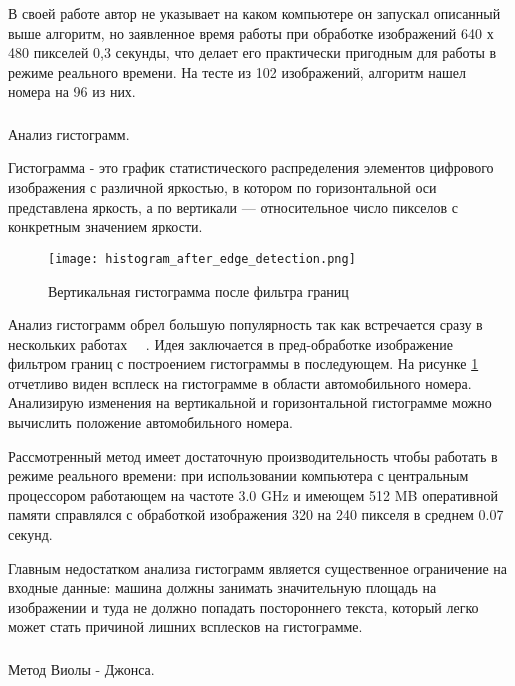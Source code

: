 В своей работе автор не указывает на каком компьютере он запускал описанный выше алгоритм, но заявленное время работы при обработке изображений 640 х 480 пикселей 0,3 секунды, что делает его практически пригодным для работы в режиме реального времени. На тесте из 102 изображений, алгоритм нашел номера на 96 из них.

\subsubsection{}
\label{sub:domain:search:histogram_analisys}
Анализ гистограмм.

Гистограмма - это график статистического распределения элементов цифрового изображения с различной яркостью, в котором по горизонтальной оси представлена яркость, а по вертикали — относительное число пикселов с конкретным значением яркости.~\cite{color_histogram}

\begin{figure}[ht]
\centering
    \texttt{[image: histogram\_after\_edge\_detection.png]}  
    \caption{Вертикальная гистограмма после фильтра границ}
    \label{fig:domain:search:edges_analisys:vertical_histogram_after_edge_detection}
\end{figure}

Анализ гистограмм обрел большую популярность так как встречается сразу в нескольких работах ~\cite{recognition_using_histogram_1}~\cite{recognition_using_histogram_2}. 
Идея заключается в пред-обработке изображение фильтром границ с построением гистограммы в последующем. На рисунке \ref{fig:domain:search:edges_analisys:vertical_histogram_after_edge_detection} отчетливо виден всплеск на гистограмме в области автомобильного номера. Анализирую изменения на вертикальной и горизонтальной гистограмме можно вычислить положение автомобильного номера. 

Рассмотренный метод имеет достаточную производительность чтобы работать в режиме реального времени: при использовании компьютера с центральным процессором работающем на частоте 3.0 GHz и имеющем 512 MB оперативной памяти справлялся с обработкой изображения 320 на 240 пикселя в среднем 0.07 секунд.

Главным недостатком анализа гистограмм является существенное ограничение на входные данные: машина должны занимать значительную площадь на изображении и туда не должно попадать постороннего текста, который легко может стать причиной лишних всплесков на гистограмме.

\subsubsection{}
\label{sub:domain:search:violajones}
Метод Виолы - Джонса.

